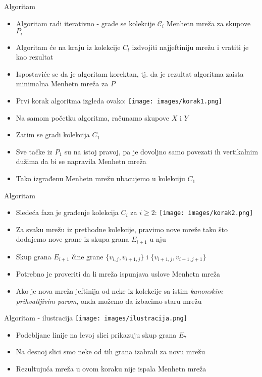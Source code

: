\documentclass[10pt]{beamer}
\begin{document}
\begin{frame}{Algoritam}
    \begin{itemize}
        \item Algoritam radi iterativno - grade se kolekcije $\mathcal{C}_i$ Menhetn mreža za skupove $P_i$
        \item Algoritam će na kraju iz kolekcije $C_l$ izdvojiti najjeftiniju mrežu i vratiti je kao rezultat
        \item Ispostaviće se da je algoritam korektan, tj. da je rezultat algoritma zaista minimalna Menhetn mreža za $P$
        \item Prvi korak algoritma izgleda ovako:
        \texttt{[image: images/korak1.png]}
        \item Na samom početku algoritma, računamo skupove $X$ i $Y$
        \item Zatim se gradi kolekcija $C_1$
        \item Sve tačke iz $P_1$ su na istoj pravoj, pa je dovoljno samo povezati ih vertikalnim dužima da bi se napravila Menhetn mreža
        \item Tako izgrađenu Menhetn mrežu ubacujemo u kolekciju $C_1$
    \end{itemize}
\end{frame}

\begin{frame}{Algoritam}
    \begin{itemize}
        \item Sledeća faza je građenje kolekcija $C_i$ za $i \geq 2$:
        \texttt{[image: images/korak2.png]}
        \item Za svaku mrežu iz prethodne kolekcije, pravimo nove mreže tako što dodajemo nove grane iz skupa grana $E_{i+1}$ u nju
        \item Skup grana $E_{i+1}$ čine grane $\{v_{i, j}, v_{i+1, j}\}$ i $\{v_{i+1, j}, v_{i+1, j+1}\}$
        \item Potrebno je proveriti da li mreža ispunjava uslove Menhetn mreža
        \item Ako je nova mreža jeftinija od neke iz kolekcije sa istim \textit{kanonskim prihvatljivim parom}, onda možemo da izbacimo staru mrežu
    \end{itemize}
\end{frame}

\begin{frame}{Algoritam - ilustracija}
    \centering
    \texttt{[image: images/ilustracija.png]}
    \begin{itemize}
        \item Podebljane linije na levoj slici prikazuju skup grana $E_7$
        \item Na desnoj slici smo neke od tih grana izabrali za novu mrežu
        \item Rezultujuća mreža u ovom koraku nije ispala Menhetn mreža
    \end{itemize}
\end{frame}
\end{document}
